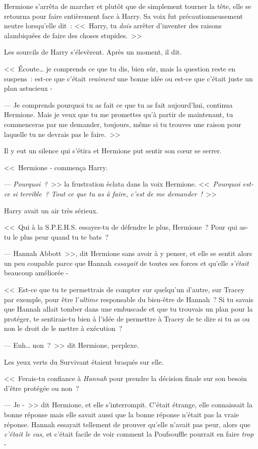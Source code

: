 Hermione s'arrêta de marcher et plutôt que de simplement tourner la tête, elle se retourna pour faire entièrement face à Harry. Sa voix fut précautionneusement neutre lorsqu'elle dit~: <<~Harry, tu \emph{dois} arrêter d'inventer des raisons alambiquées de faire des choses stupides.~>>

Les sourcils de Harry s'élevèrent. Après un moment, il dit.

<<~Écoute… je comprends ce que tu dis, bien sûr, mais la question reste en suspens~: est-ce que c'était \emph{vraiment} une bonne idée ou est-ce que c'était juste un plan astucieux -

--- Je comprends pourquoi tu as fait ce que tu as fait aujourd'hui, continua Hermione. Mais je veux que tu me promettes qu'à partir de maintenant, tu commenceras par me demander, toujours, même si tu trouves une raison pour laquelle tu ne devrais pas le faire.~>>

Il y eut un silence qui s'étira et Hermione put sentir son cœur se serrer.

<<~Hermione - commença Harry.

--- \emph{Pourquoi~?}~>> la frustration éclata dans la voix Hermione. <<~\emph{Pourquoi est-ce si terrible~? Tout ce que tu as à faire, c'est de me demander~!}~>>

Harry avait un air très sérieux.

<<~Qui à la S.P.E.H.S. essayes-tu de défendre le plus, Hermione~? Pour qui as-tu le plus peur quand tu te bats~?

--- Hannah Abbott~>>, dit Hermione sans avoir à y penser, et elle se sentit alors un peu coupable parce que Hannah \emph{essayait} de toutes ses forces et qu'elle \emph{s'était} beaucoup améliorée -

<<~Est-ce que tu te permettrais de compter sur quelqu'un d'autre, sur Tracey par exemple, pour être l'\emph{ultime} responsable du bien-être de Hannah~? Si tu savais que Hannah allait tomber dans une embuscade et que tu trouvais un plan pour la protéger, te sentirais-tu bien à l'idée de permettre à Tracey de te dire si tu as ou non le droit de le mettre à exécution~?

--- Euh… non~?~>> dit Hermione, perplexe.

Les yeux verts du Survivant étaient braqués sur elle.

<<~Ferais-tu confiance à \emph{Hannah} pour prendre la décision finale sur son besoin d'être protégée ou non~?

--- Je -~>> dit Hermione, et elle s'interrompit. C'était étrange, elle connaissait la bonne réponse mais elle savait aussi que la bonne réponse n'était pas la vraie réponse. Hannah essayait tellement de prouver qu'elle n'avait pas peur, alors que \emph{c'était le cas}, et c'était facile de voir comment la Poufsouffle pourrait en faire \emph{trop} -

